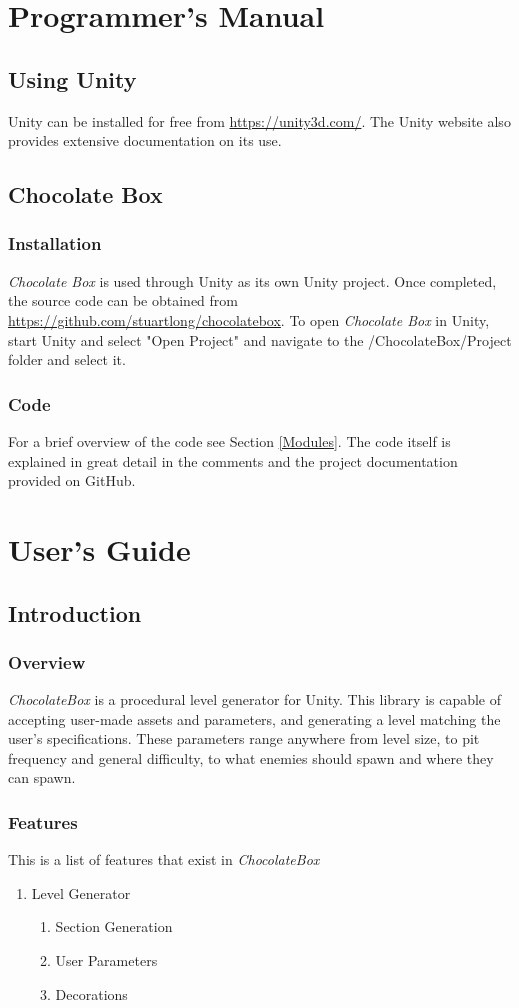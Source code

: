 \documentclass[pdftex,12pt,letter]{article}
\begin{document}
\begin{itemize}
\begin{itemize}
\begin{itemize}
\begin{itemize}
\appendix
\section{Programmer's Manual}
\subsection{Using Unity}
Unity can be installed for free from \url{https://unity3d.com/}. The Unity website also provides extensive documentation on its use.
\subsection{Chocolate Box}
\subsubsection{Installation}
\textit{Chocolate Box} is used through Unity as its own Unity project. Once completed, the source code can be obtained from \url{https://github.com/stuartlong/chocolatebox}. To open \textit{Chocolate Box} in Unity, start Unity and select "Open Project" and navigate to the /ChocolateBox/Project folder and select it.
\subsubsection{Code}
For a brief overview of the code see Section \ref{Modules}. The code itself is explained in great detail in the comments and the project documentation provided on GitHub.
\section{User's Guide}
\subsection{Introduction}
\subsubsection{Overview}
\textit{ChocolateBox} is a procedural level generator for Unity. This library is capable of accepting user-made assets and parameters, and generating a level matching the user's specifications. These parameters range anywhere from level size, to pit frequency and general difficulty, to what enemies should spawn and where they can spawn.
\subsubsection{Features}
This is a list of features that exist in \textit{ChocolateBox}
\begin{enumerate}
\item Level Generator
\begin{enumerate}
\item Section Generation
\item User Parameters
\item Decorations
\end{enumerate}


\end{enumerate}
\end{itemize}
\end{itemize}
\end{itemize}
\end{itemize}
\end{document}
